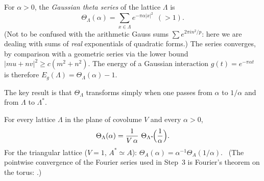 For $\alpha>0$, the \emph{Gaussian theta series} of the lattice $\Lambda$ is
\[
  \Theta_\Lambda(\alpha)=\sum_{x\in\Lambda}e^{-\pi\alpha|x|^2}\ \ (>1).
\]
(Not to be confused with the arithmetic Gauss sums $\sum e^{2\pi i n^2/p}$: here we are dealing with sums of \emph{real}
exponentials of quadratic forms.) The series converges, by comparison with a geometric series via the lower bound
$|mu+nv|^2\ge c(m^2+n^2)$. The energy of a Gaussian interaction $g(t)=e^{-\pi\alpha t}$ is therefore
$E_g(\Lambda)=\Theta_\Lambda(\alpha)-1$.

The key result is that $\Theta_\Lambda$ transforms simply when one passes from $\alpha$ to $1/\alpha$ and from $\Lambda$ to $\Lambda^*$.

\begin{theorem}\label{ch1:thm:poisson}
For every lattice $\Lambda$ in the plane of covolume $V$ and every $\alpha>0$,
\[
  \Theta_\Lambda(\alpha)=\frac{1}{V\,\alpha}\ \Theta_{\Lambda^*}\!\Bigl(\frac1\alpha\Bigr).
\]
For the triangular lattice ($V=1$, $A^*\simeq A$): $\Theta_A(\alpha)=\alpha^{-1}\Theta_A(1/\alpha)$. \tierC{}\
(The pointwise convergence of the Fourier series used in Step~3 is Fourier's theorem on the torus: \tierL{}.)
\end{theorem}

